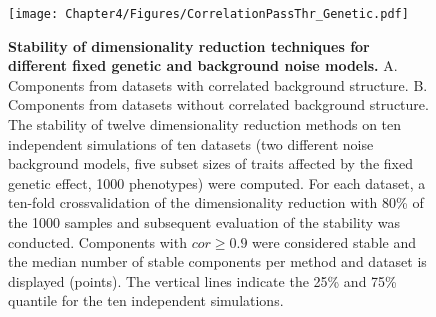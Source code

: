 \begin{figure}[hbtp]
	\centering
	\texttt{[image: Chapter4/Figures/CorrelationPassThr\_Genetic.pdf]}
\caption[\textbf{Stability of dimensionality reduction techniques for different fixed genetic and background noise models.}]{\textbf{Stability of dimensionality reduction techniques for different fixed genetic and background noise models. }A. Components from datasets with correlated background structure. B. Components from datasets without correlated background structure. The stability of twelve dimensionality reduction methods on ten independent simulations of ten datasets (two different noise background models, five subset sizes of traits affected by the fixed genetic effect, \num{1000} phenotypes) were computed.  For each dataset, a ten-fold crossvalidation of the dimensionality reduction with \num{80}\% of the \num{1000} samples and subsequent evaluation of the stability was conducted. Components with \(cor \ge 0.9\) were considered stable and the median number of stable components per method and dataset is displayed (points). The vertical lines indicate the \num{25}\% and \num{75}\% quantile for the ten independent simulations. } 
	 	\label{fig:cor-genetic}
\end{figure}

